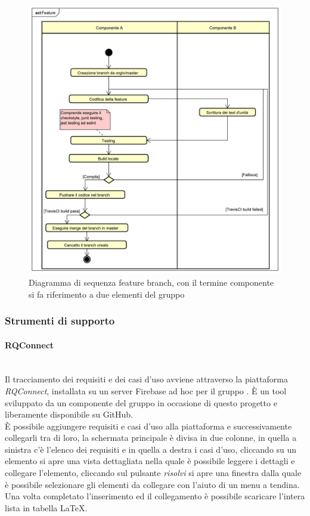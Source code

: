 \begin{figure}[H]
\centering
\includegraphics[width=17cm,keepaspectratio]{img/Feature.pdf}
\caption{Diagramma di sequenza feature branch, con il termine componente si fa riferimento a due elementi del gruppo}
\end{figure}
\subsubsection{Strumenti di supporto}
\paragraph{RQConnect}\mbox{}\\ \label{sec:Trac}
Il tracciamento dei requisiti e dei casi d’uso avviene attraverso la piattaforma 
\textit{RQConnect}, installata su un server {Firebase} ad hoc per il gruppo \gruppo.
 È  un tool sviluppato da un componente del gruppo in occasione di questo progetto e 
 liberamente disponibile su GitHub.\\ È possibile aggiungere requisiti e casi d’uso 
 alla piattaforma e successivamente collegarli tra di loro, la schermata principale è 
 divisa in due colonne, in quella a sinistra c’è l’elenco dei requisiti e in quella a 
 destra i casi d’uso, cliccando su un elemento si apre una vista dettagliata nella quale 
 è possibile leggere i dettagli e collegare l’elemento, cliccando sul pulsante \textit{risolvi} si 
 apre una finestra dalla quale è possibile selezionare gli elementi da collegare con l’aiuto 
 di un menu a tendina.\\Una volta completato l’inserimento ed il collegamento è possibile scaricare 
 l’intera lista in tabella \LaTeX.

